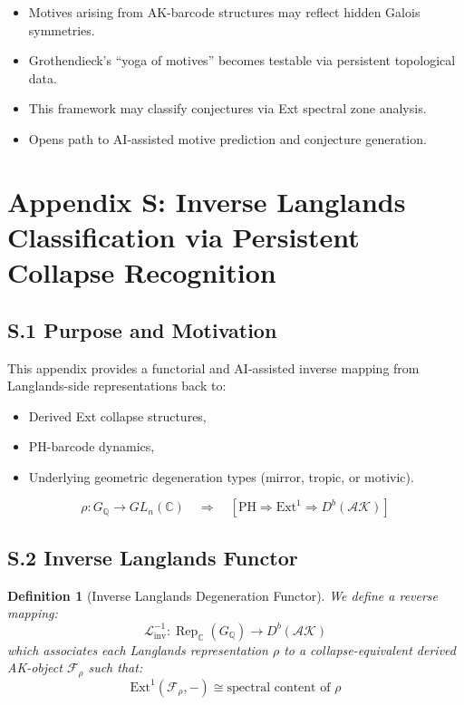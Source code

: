 \documentclass[11pt]{article}
\newtheorem{definition}[theorem]{Definition}
\begin{document}
\begin{itemize}
  \item Motives arising from AK-barcode structures may reflect hidden Galois symmetries.
  \item Grothendieck’s “yoga of motives” becomes testable via persistent topological data.
  \item This framework may classify conjectures via Ext spectral zone analysis.
  \item Opens path to AI-assisted motive prediction and conjecture generation.
\end{itemize}


\section*{Appendix S: Inverse Langlands Classification via Persistent Collapse Recognition}

\subsection*{S.1 Purpose and Motivation}

This appendix provides a functorial and AI-assisted inverse mapping from Langlands-side representations back to:

\begin{itemize}
  \item Derived Ext collapse structures,
  \item PH-barcode dynamics,
  \item Underlying geometric degeneration types (mirror, tropic, or motivic).
\end{itemize}

\[
\boxed{
\rho: G_{\mathbb{Q}} \to GL_n(\mathbb{C})
\quad \Rightarrow \quad
[\text{PH} \Rightarrow \mathrm{Ext}^1 \Rightarrow D^b(\mathcal{AK})]
}
\]

\subsection*{S.2 Inverse Langlands Functor}

\begin{definition}[Inverse Langlands Degeneration Functor]
We define a reverse mapping:
\[
\mathcal{L}^{-1}_{\mathrm{inv}} : \operatorname{Rep}_{\mathbb{C}}(G_{\mathbb{Q}}) \to D^b(\mathcal{AK})
\]
which associates each Langlands representation \( \rho \) to a collapse-equivalent derived AK-object \( \mathcal{F}_\rho \) such that:
\[
\mathrm{Ext}^1(\mathcal{F}_\rho, -) \cong \text{spectral content of } \rho
\]
\end{definition}
\end{document}
